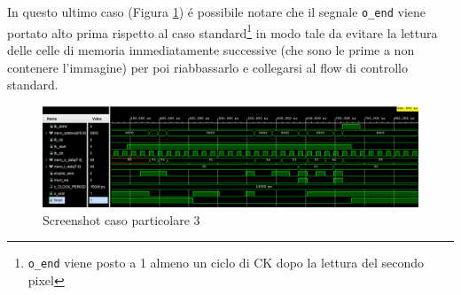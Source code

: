 In questo ultimo caso (Figura \ref{2}) é possibile notare che il segnale \texttt{o\_end} viene portato alto prima rispetto al caso standard\footnote{\texttt{o\_end} viene posto a 1 almeno un ciclo di CK dopo la lettura del secondo pixel} in modo tale da evitare la lettura delle celle di memoria immediatamente successive (che sono le prime a non contenere l'immagine) per poi riabbassarlo e collegarsi al flow di controllo standard.
\begin{figure}[h!]
    \centering
    \includegraphics[scale = 0.45]{Figure/TB_2x1.PNG}
    \caption{Screenshot caso particolare 3}
    \label{2}
\end{figure}

\clearpage
